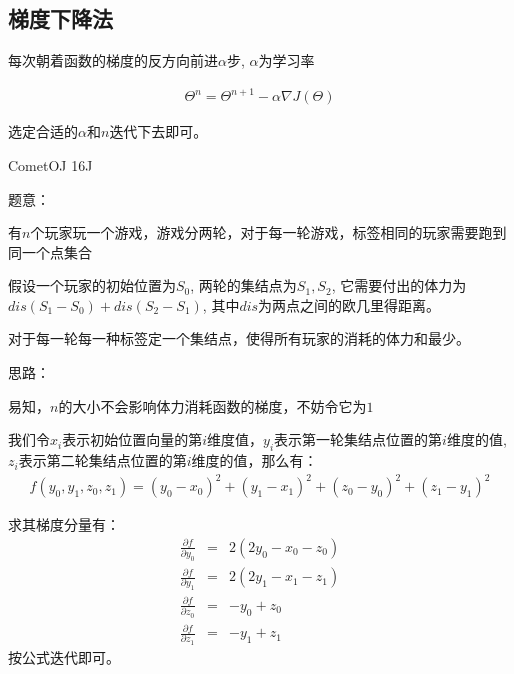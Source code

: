 \subsection{梯度下降法}

每次朝着函数的梯度的反方向前进$\alpha$步, $\alpha$为学习率\par

\begin{eqnarray*}
\Theta^n = \Theta^{n + 1} - \alpha \nabla J(\Theta) 
\end{eqnarray*}

选定合适的$\alpha$和$n$迭代下去即可。\par

CometOJ 16J\par
题意：\par
有$n$个玩家玩一个游戏，游戏分两轮，对于每一轮游戏，标签相同的玩家需要跑到同一个点集合\par
假设一个玩家的初始位置为$S_0$, 两轮的集结点为$S_1, S_2$, 它需要付出的体力为$dis(S_1 - S_0) + dis(S_2 - S_1)$, 其中$dis$为两点之间的欧几里得距离。\par
对于每一轮每一种标签定一个集结点，使得所有玩家的消耗的体力和最少。\par

思路：\par
易知，$n$的大小不会影响体力消耗函数的梯度，不妨令它为$1$\par
我们令$x_i$表示初始位置向量的第$i$维度值，$y_i$表示第一轮集结点位置的第$i$维度的值, $z_i$表示第二轮集结点位置的第$i$维度的值，那么有：
\begin{eqnarray*}
f(y_0, y_1, z_0, z_1) = (y_0 - x_0)^2 + (y_1 - x_1)^2 + (z_0 - y_0)^2 + (z_1 - y_1)^2
\end{eqnarray*}

求其梯度分量有：
\begin{eqnarray*}
\frac{\partial f}{\partial y_0} &=& 2(2y_0 - x_0 - z_0) \\
\frac{\partial f}{\partial y_1} &=& 2(2y_1 - x_1 - z_1) \\
\frac{\partial f}{\partial z_0} &=& -y_0 + z_0 \\ 
\frac{\partial f}{\partial z_1} &=& -y_1 + z_1
\end{eqnarray*}
按公式迭代即可。\par


